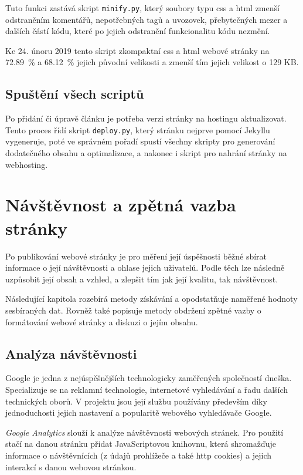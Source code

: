 \documentclass[a4paper, 12pt]{article}
\begin{document}
  Tuto funkci zastává skript \texttt{minify.py}, který soubory typu \gls{css} a \gls{html} zmenší odstraněním komentářů, nepotřebných tagů a uvozovek, přebytečných mezer a dalších částí kódu, které po jejich odstranění funkcionalitu kódu nezmění.

  Ke 24. únoru 2019 tento skript zkompaktní \gls{css} a \gls{html} webové stránky na \SI{72.89}{\percent} a \SI{68.12}{\percent} jejich původní velikosti a zmenší tím jejich velikost o \num{129} KB.


  \subsection{Spuštění všech scriptů}
  Po přidání či úpravě článku je potřeba verzi stránky na hostingu aktualizovat. Tento proces řídí skript \texttt{deploy.py}, který stránku nejprve pomocí Jekyllu vygeneruje, poté ve správném pořadí spustí všechny skripty pro generování dodatečného obsahu a optimalizace, a nakonec i skript pro nahrání stránky na webhosting.


  \section{Návštěvnost a zpětná vazba stránky}
  Po publikování webové stránky je pro měření její úspěšnosti běžné sbírat informace o její návštěvnosti a ohlase jejich uživatelů. Podle těch lze následně uzpůsobit její obsah a vzhled, a zlepšit tím jak její kvalitu, tak návštěvnost.

  Následující kapitola rozebírá metody získávání a opodstatňuje naměřené hodnoty sesbíraných dat. Rovněž také popisuje metody obdržení zpětné vazby o formátování webové stránky a diskuzi o jejím obsahu.


  \subsection{Analýza návštěvnosti}
  Google je jedna z nejúspěšnějších technologicky zaměřených společností dneška. Specializuje se na reklamní technologie, internetové vyhledávání a řadu dalších technických oborů. V projektu jsou její službu používány především díky jednoduchosti jejich nastavení a popularitě webového vyhledávače Google.

  \emph{Google Analytics} slouží k analýze návštěvnosti webových stránek. Pro použití stačí na danou stránku přidat JavaScriptovou knihovnu, která shromažďuje informace o návštěvnících (z údajů prohlížeče a také \gls{http} cookies) a jejich interakcí s danou webovou stránkou.
\end{document}

